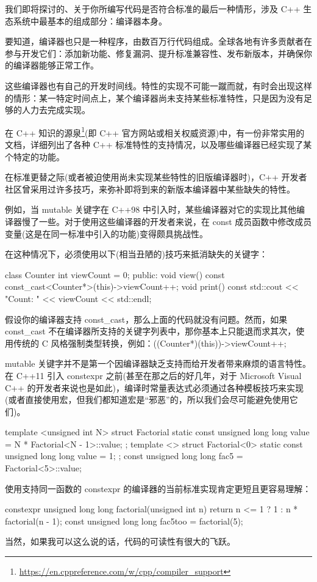 我们即将探讨的、关于你所编写代码是否符合标准的最后一种情形，涉及 C++ 生态系统中最基本的组成部分：编译器本身。

要知道，编译器也只是一种程序，由数百万行代码组成。全球各地有许多贡献者在参与开发它们：添加新功能、修复漏洞、提升标准兼容性、发布新版本，并确保你的编译器能够正常工作。

这些编译器也有自己的开发时间线。特性的实现不可能一蹴而就，有时会出现这样的情形：某一特定时间点上，某个编译器尚未支持某些标准特性，只是因为没有足够的人力去完成实现。

在 C++ 知识的源泉\footnote{\url{https://en.cppreference.com/w/cpp/compiler_support}}(即 C++ 官方网站或相关权威资源)中，有一份非常实用的文档，详细列出了各种 C++ 标准特性的支持情况，以及哪些编译器已经实现了某个特定的功能。

在标准更替之际(或者被迫使用尚未实现某些特性的旧版编译器时)，C++ 开发者社区曾采用过许多技巧，来弥补即将到来的新版本编译器中某些缺失的特性。

例如，当 mutable 关键字在 C++98 中引入时，某些编译器对它的实现比其他编译器慢了一些。对于使用这些编译器的开发者来说，在 const 成员函数中修改成员变量(这是在同一标准中引入的功能)变得颇具挑战性。

在这种情况下，必须使用以下(相当丑陋的)技巧来抵消缺失的关键字：

\begin{cpp}
class Counter {
  int viewCount = 0;
public:
  void view() const {
    const_cast<Counter*>(this)->viewCount++;
  }
  void print() const {
    std::cout << "Count: " << viewCount << std::endl;
  }
}
\end{cpp}

假设你的编译器支持 const\_cast，那么上面的代码就没有问题。然而，如果 const\_cast 不在编译器所支持的关键字列表中，那你基本上只能退而求其次，使用传统的 C 风格强制类型转换，例如：((Counter*)(this))->viewCount++; 

mutable 关键字并不是第一个因编译器缺乏支持而给开发者带来麻烦的语言特性。在 C++11 引入 constexpr 之前(甚至在那之后的好几年，对于 Microsoft Visual C++ 的开发者来说也是如此)，编译时常量表达式必须通过各种模板技巧来实现(或者直接使用宏，但我们都知道宏是“邪恶”的，所以我们会尽可能避免使用它们)。

\begin{cpp}
template <unsigned int N>
struct Factorial {
  static const unsigned long long value = N * Factorial<N - 1>::value;
};
template <>
struct Factorial<0> {
  static const unsigned long long value = 1;
};
const unsigned long long fac5 = Factorial<5>::value;
\end{cpp}

使用支持同一函数的 constexpr 的编译器的当前标准实现肯定更短且更容易理解：

\begin{cpp}
constexpr unsigned long long factorial(unsigned int n) {
  return n <= 1 ? 1 : n * factorial(n - 1);
}
const unsigned long long fac5too = factorial(5);
\end{cpp}

当然，如果我可以这么说的话，代码的可读性有很大的飞跃。






















